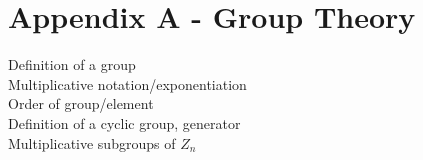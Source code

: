 \section{Appendix A - Group Theory}

Definition of a group\\
Multiplicative notation/exponentiation\\
Order of group/element\\
Definition of a cyclic group, generator\\
Multiplicative subgroups of $Z_n$
